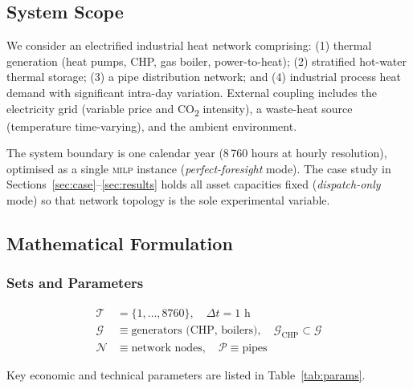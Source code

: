 \documentclass[a4paper,fleqn]{cas-sc}
\newcommand{\milp}{\textsc{milp}}
\begin{document}
\subsection{System Scope}

We consider an electrified industrial heat network comprising: (1) thermal
generation (heat pumps, CHP, gas boiler, power-to-heat); (2) stratified hot-water
thermal storage; (3) a pipe distribution network; and (4) industrial process
heat demand with significant intra-day variation.  External coupling includes
the electricity grid (variable price and CO\textsubscript{2} intensity),
a waste-heat source (temperature time-varying), and the ambient environment.

The system boundary is one calendar year (8\,760 hours at hourly resolution),
optimised as a single \milp{} instance (\emph{perfect-foresight} mode).  The
case study in Sections~\ref{sec:case}--\ref{sec:results} holds all asset
capacities fixed (\emph{dispatch-only} mode) so that network topology is the
sole experimental variable.

\subsection{Mathematical Formulation}

\subsubsection{Sets and Parameters}

\begin{align*}
  \mathcal{T} &= \{1,\ldots,8760\},\quad \Delta t = 1\text{ h}\\
  \mathcal{G} &\equiv \text{generators (CHP, boilers)},\quad
  \mathcal{G}_{\mathrm{CHP}} \subset \mathcal{G}\\
  \mathcal{N} &\equiv \text{network nodes},\quad
  \mathcal{P} \equiv \text{pipes}
\end{align*}

Key economic and technical parameters are listed in
Table~\ref{tab:params}.
\end{document}
